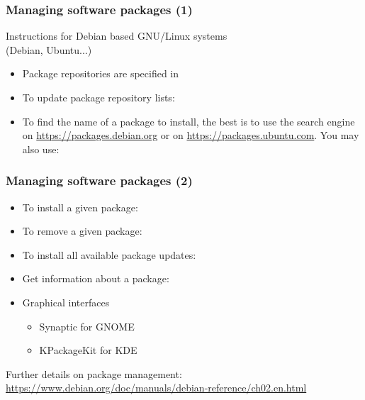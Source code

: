 \begin{frame}
  \frametitle{Managing software packages (1)}
  Instructions for Debian based GNU/Linux systems\\
  (Debian, Ubuntu...)
  \begin{itemize}
  \item Package repositories are specified in 
  \item To update package repository lists:\\
  \item To find the name of a package to install, the best is to use
    the search engine on \url{https://packages.debian.org} or on
    \url{https://packages.ubuntu.com}. You may
    also use:\\
  \end{itemize}
\end{frame}

\begin{frame}
  \frametitle{Managing software packages (2)}
  \begin{itemize}
  \item To install a given package:\\
  \item To remove a given package:\\
  \item To install all available package updates:\\
  \item Get information about a package:\\
  \item Graphical interfaces
    \begin{itemize}
    \item Synaptic for GNOME
    \item KPackageKit for KDE
    \end{itemize}
  \end{itemize}
  Further details on package management:\\
  \url{https://www.debian.org/doc/manuals/debian-reference/ch02.en.html}
\end{frame}


